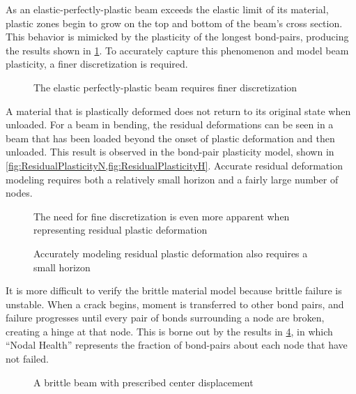 \documentclass[preprint,review,12pt]{elsarticle}
\newcommand{\plotpath}{./plots}
\begin{document}
As an elastic-perfectly-plastic beam exceeds the elastic limit of its material, plastic zones begin to grow on the top and bottom of the beam's cross section.
This behavior is mimicked by the plasticity of the longest bond-pairs, producing the results shown in \cref{fig:eppu_h10_g2000}.
To accurately capture this phenomenon and model beam plasticity, a finer discretization is required.
\begin{figure}[h]
  \centering
  \resizebox{0.5\linewidth}{!}{}
  \caption{The elastic perfectly-plastic beam requires finer discretization}
  \label{fig:eppu_h10_g2000}
\end{figure}

A material that is plastically deformed does not return to its original state when unloaded.
For a beam in bending, the residual deformations can be seen in a beam that has been loaded beyond the onset of plastic deformation and then unloaded.
This result is observed in the bond-pair plasticity model, shown in \cref{fig:ResidualPlasticityN,fig:ResidualPlasticityH}. 
Accurate residual deformation modeling requires both a relatively small horizon and a fairly large number of nodes.

%
\begin{figure}[h]
  \centering
  \resizebox{0.5\linewidth}{!}{}
  \caption{The need for fine discretization is even more apparent when representing residual plastic deformation}
  \label{fig:ResidualPlasticityN}
\end{figure}
%
\begin{figure}[h]
  \centering
  \resizebox{0.5\linewidth}{!}{}
  \caption{Accurately modeling residual plastic deformation also requires a small horizon}
  \label{fig:ResidualPlasticityH}
\end{figure}

It is more difficult to verify the brittle material model because brittle failure is unstable.
When a crack begins, moment is transferred to other bond pairs, and failure progresses until every pair of bonds surrounding a node are broken, creating a hinge at that node.
This is borne out by the results in \cref{fig:brittleBeam}, in which ``Nodal Health'' represents the fraction of bond-pairs about each node that have not failed.

\begin{figure}[h]
  \centering
  \resizebox{0.5\linewidth}{!}{}
  \caption{A brittle beam with prescribed center displacement}
  \label{fig:brittleBeam}
\end{figure}
\end{document}

